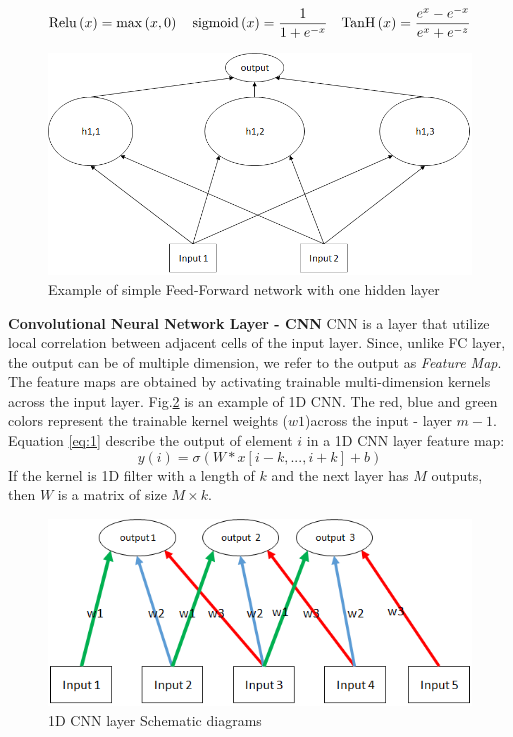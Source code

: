 \documentclass[
12pt, %
english, %
doublespacing, %
headsepline, %
]{MastersDoctoralThesis} %
\begin{document}
\[{\rm{Relu}}\left( x \right) = \max \left( {x,0} \right)\,\,\,\,\,\,{\rm{sigmoid}}\left( x \right) = \frac{1}{{1 + {e^{ - x}}}}\,\,\,\,\,\,{\mathop{\rm Tan}\nolimits} {\rm{H}}\left( x \right) = \frac{{{e^x} - {e^{ - x}}}}{{{e^x} + {e^{ - z}}}}\]

\begin{figure}
\centering
\includegraphics[width=0.7\linewidth]{Figures/FF_Example}
\caption{Example of simple Feed-Forward network with one hidden layer}
\label{fig:FF_Example}
\end{figure}

\textbf{Convolutional Neural Network Layer - CNN } CNN is a layer that utilize local correlation between adjacent cells of the input layer. Since, unlike FC layer, the output can be of multiple dimension, we refer to the output as \textit{Feature Map}. The feature maps are obtained by activating trainable multi-dimension kernels across the input layer. Fig.\ref{fig:CNN_Example} is an example of 1D CNN. The red, blue and green colors represent the trainable kernel weights ($w1$)across the input - layer $m-1$. Equation \ref{eq:1} describe the output of element $i$ in a 1D CNN layer feature map:
\begin{equation} \label{eq:1}
y\left( i \right) = \sigma \left( {W * x\left[ {i - k,...,i + k} \right] + b} \right)
\end{equation}
If the kernel is 1D filter with a length of $k$ and the next layer has $M$ outputs, then $W$ is a matrix of size $M \times k$.

\begin{figure}[t]
			\centering
			\includegraphics{CNN_Example.png}
			\caption[1D CNN layer Schematic diagrams]{1D CNN layer Schematic diagrams}
			\label{fig:CNN_Example}
\end{figure}
\end{document}
